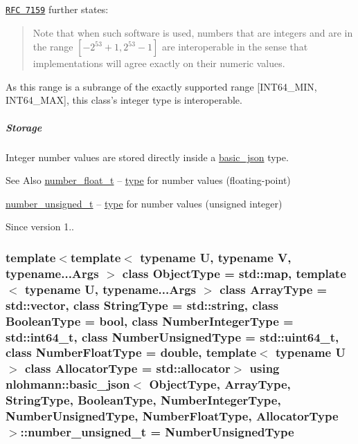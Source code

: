 \href{http://rfc7159.net/rfc7159}{\tt R\-F\-C 7159} further states\-: \begin{quotation}
Note that when such software is used, numbers that are integers and are in the range $[-2^{53}+1, 2^{53}-1]$ are interoperable in the sense that implementations will agree exactly on their numeric values.

\end{quotation}


As this range is a subrange of the exactly supported range \mbox{[}I\-N\-T64\-\_\-\-M\-I\-N, I\-N\-T64\-\_\-\-M\-A\-X\mbox{]}, this class's integer type is interoperable.

\subparagraph*{Storage}

Integer number values are stored directly inside a \hyperlink{classnlohmann_1_1basic__json}{basic\-\_\-json} type.

\begin{DoxySeeAlso}{See Also}
\hyperlink{classnlohmann_1_1basic__json_a74a0013e847fdc574b48f931f0e757e1}{number\-\_\-float\-\_\-t} -- \hyperlink{classnlohmann_1_1basic__json_a5d466b240d0ba9f648d7fd4ff42359f5}{type} for number values (floating-\/point)

\hyperlink{classnlohmann_1_1basic__json_a60a04166c122072ab11eaf9845d9cd1d}{number\-\_\-unsigned\-\_\-t} -- \hyperlink{classnlohmann_1_1basic__json_a5d466b240d0ba9f648d7fd4ff42359f5}{type} for number values (unsigned integer)
\end{DoxySeeAlso}
\begin{DoxySince}{Since}
version 1.. 
\end{DoxySince}
\hypertarget{classnlohmann_1_1basic__json_a60a04166c122072ab11eaf9845d9cd1d}{
\subsubsection[{number\-\_\-unsigned\-\_\-t}]{\setlength{\rightskip}{0pt plus 5cm}template$<$template$<$ typename U, typename V, typename...\-Args $>$ class Object\-Type = std\-::map, template$<$ typename U, typename...\-Args $>$ class Array\-Type = std\-::vector, class String\-Type  = std\-::string, class Boolean\-Type  = bool, class Number\-Integer\-Type  = std\-::int64\-\_\-t, class Number\-Unsigned\-Type  = std\-::uint64\-\_\-t, class Number\-Float\-Type  = double, template$<$ typename U $>$ class Allocator\-Type = std\-::allocator$>$ using {\bf nlohmann\-::basic\-\_\-json}$<$ Object\-Type, Array\-Type, String\-Type, Boolean\-Type, Number\-Integer\-Type, Number\-Unsigned\-Type, Number\-Float\-Type, Allocator\-Type $>$\-::{\bf number\-\_\-unsigned\-\_\-t} =  Number\-Unsigned\-Type}}\label{classnlohmann_1_1basic__json_a60a04166c122072ab11eaf9845d9cd1d}


